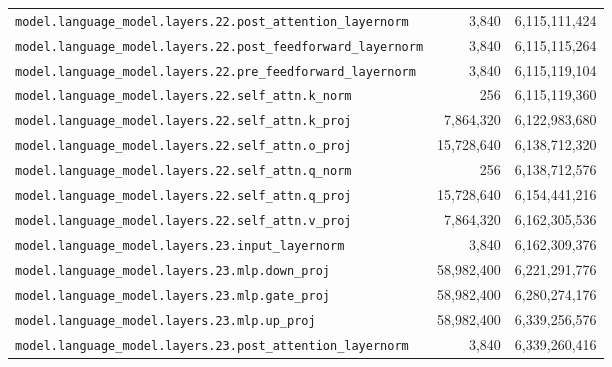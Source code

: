 \documentclass[10pt,a4paper]{article}
\theoremstyle{definition}
\begin{document}
\begin{appendices}
\begin{longtable}{p{9.5cm}rr}
\texttt{model.\allowbreak{}language\_model.\allowbreak{}layers.\allowbreak{}22.\allowbreak{}post\_attention\_layernorm} & 3,840 & 6,115,111,424 \\
\texttt{model.\allowbreak{}language\_model.\allowbreak{}layers.\allowbreak{}22.\allowbreak{}post\_feedforward\_layernorm} & 3,840 & 6,115,115,264 \\
\texttt{model.\allowbreak{}language\_model.\allowbreak{}layers.\allowbreak{}22.\allowbreak{}pre\_feedforward\_layernorm} & 3,840 & 6,115,119,104 \\
\texttt{model.\allowbreak{}language\_model.\allowbreak{}layers.\allowbreak{}22.\allowbreak{}self\_attn.\allowbreak{}k\_norm} & 256 & 6,115,119,360 \\
\texttt{model.\allowbreak{}language\_model.\allowbreak{}layers.\allowbreak{}22.\allowbreak{}self\_attn.\allowbreak{}k\_proj} & 7,864,320 & 6,122,983,680 \\
\texttt{model.\allowbreak{}language\_model.\allowbreak{}layers.\allowbreak{}22.\allowbreak{}self\_attn.\allowbreak{}o\_proj} & 15,728,640 & 6,138,712,320 \\
\texttt{model.\allowbreak{}language\_model.\allowbreak{}layers.\allowbreak{}22.\allowbreak{}self\_attn.\allowbreak{}q\_norm} & 256 & 6,138,712,576 \\
\texttt{model.\allowbreak{}language\_model.\allowbreak{}layers.\allowbreak{}22.\allowbreak{}self\_attn.\allowbreak{}q\_proj} & 15,728,640 & 6,154,441,216 \\
\texttt{model.\allowbreak{}language\_model.\allowbreak{}layers.\allowbreak{}22.\allowbreak{}self\_attn.\allowbreak{}v\_proj} & 7,864,320 & 6,162,305,536 \\
\texttt{model.\allowbreak{}language\_model.\allowbreak{}layers.\allowbreak{}23.\allowbreak{}input\_layernorm} & 3,840 & 6,162,309,376 \\
\texttt{model.\allowbreak{}language\_model.\allowbreak{}layers.\allowbreak{}23.\allowbreak{}mlp.\allowbreak{}down\_proj} & 58,982,400 & 6,221,291,776 \\
\texttt{model.\allowbreak{}language\_model.\allowbreak{}layers.\allowbreak{}23.\allowbreak{}mlp.\allowbreak{}gate\_proj} & 58,982,400 & 6,280,274,176 \\
\texttt{model.\allowbreak{}language\_model.\allowbreak{}layers.\allowbreak{}23.\allowbreak{}mlp.\allowbreak{}up\_proj} & 58,982,400 & 6,339,256,576 \\
\texttt{model.\allowbreak{}language\_model.\allowbreak{}layers.\allowbreak{}23.\allowbreak{}post\_attention\_layernorm} & 3,840 & 6,339,260,416 \\

\end{longtable}
\end{appendices}
\end{document}
